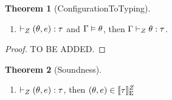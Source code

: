 \documentclass[a4paper,11pt]{article}
\theoremstyle{definition}
\newtheorem{thm}{Theorem}
\begin{document}
\begin{thm}[ConfigurationToTyping]
  \label{sound}
  \begin{enumerate} 
   \item $ \vdash_{Z}  (\theta, e) : \tau $ and $\Gamma \vDash
     \theta $, then $ \Gamma \vdash_{Z} \theta: \tau
     $.
  \end{enumerate}
\end{thm}
\begin{proof}
  TO BE ADDED.
 \end{proof} 

\begin{thm}[Soundness]
  \label{sound}
  \begin{enumerate} 
   \item $ \vdash_{Z}  (\theta, e) : \tau $, then $(\theta,
     e) \in  [\![  \tau ]\!]_{\text{E}}^{ Z} $
  \end{enumerate}
\end{thm}



\end{document}
